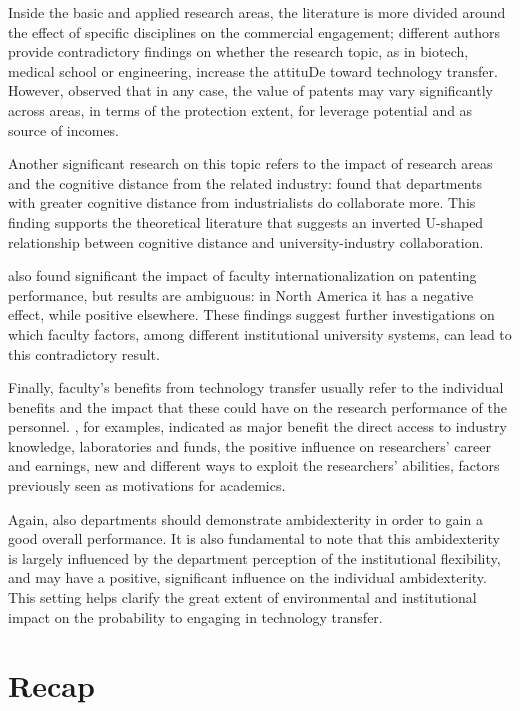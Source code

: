 Inside the basic and applied research areas, the literature is more divided around the effect of specific disciplines on the commercial engagement; different authors provide contradictory findings on whether the research topic, as in biotech, medical school or engineering, increase the attituDe toward technology transfer. However, \citet{OwenSmith2001} observed that in any case, the value of patents may vary significantly across areas, in terms of the protection extent, for leverage potential and as source of incomes. 

Another significant research on this topic refers to the impact of research areas and the cognitive distance from the related industry: \citet{Muscio2010} found that departments with greater cognitive distance from industrialists do collaborate more. This finding supports the theoretical literature that suggests an inverted U-shaped relationship between cognitive distance and university-industry collaboration.

\citet{Wong2010} also found significant the impact of faculty internationalization on patenting performance, but results are ambiguous: in North America it has a negative effect, while positive elsewhere. These findings suggest further investigations on which faculty factors, among different institutional university systems, can lead to this contradictory result. 

Finally, faculty's benefits from technology transfer usually refer to the individual benefits and the impact that these could have on the research performance of the personnel. \citet{Baldini2007}, for examples, indicated as major benefit the direct access to industry knowledge, laboratories and funds, the positive influence on researchers' career and earnings, new and different ways to exploit the researchers' abilities, factors previously seen as motivations for academics.

Again, also departments should demonstrate ambidexterity in order to gain a good overall performance. It is also fundamental to note that this ambidexterity is largely influenced by the department perception of the institutional flexibility, and may have a positive, significant influence on the individual ambidexterity. This setting helps clarify the great extent of environmental and institutional impact on the probability to engaging in technology transfer.

\section{Recap}

